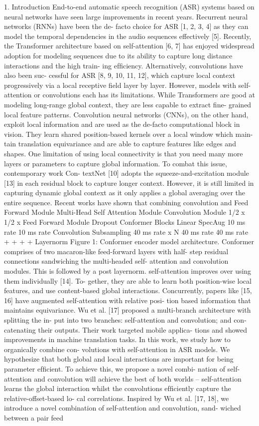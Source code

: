 1. Introduction End-to-end automatic speech recognition (ASR) systems based on neural networks have seen large improvements in recent years. Recurrent neural networks (RNNs) have been the de- facto choice for ASR [1, 2, 3, 4] as they can model the temporal dependencies in the audio sequences effectively [5]. Recently, the Transformer architecture based on self-attention [6, 7] has enjoyed widespread adoption for modeling sequences due to its ability to capture long distance interactions and the high train- ing efﬁciency. Alternatively, convolutions have also been suc- cessful for ASR [8, 9, 10, 11, 12], which capture local context progressively via a local receptive ﬁeld layer by layer. However, models with self-attention or convolutions each has its limitations. While Transformers are good at modeling long-range global context, they are less capable to extract ﬁne- grained local feature patterns. Convolution neural networks (CNNs), on the other hand, exploit local information and are used as the de-facto computational block in vision. They learn shared position-based kernels over a local window which main- tain translation equivariance and are able to capture features like edges and shapes. One limitation of using local connectivity is that you need many more layers or parameters to capture global information. To combat this issue, contemporary work Con- textNet [10] adopts the squeeze-and-excitation module [13] in each residual block to capture longer context. However, it is still limited in capturing dynamic global context as it only applies a global averaging over the entire sequence. Recent works have shown that combining convolution and Feed Forward Module Multi-Head Self Attention Module Convolution Module 1/2 x 1/2 x Feed Forward Module Dropout Conformer Blocks Linear SpecAug 10 ms rate 10 ms rate Convolution Subsampling 40 ms rate x N 40 ms rate 40 ms rate + + + + Layernorm Figure 1: Conformer encoder model architecture. Conformer comprises of two macaron-like feed-forward layers with half- step residual connections sandwiching the multi-headed self- attention and convolution modules. This is followed by a post layernorm. self-attention improves over using them individually [14]. To- gether, they are able to learn both position-wise local features, and use content-based global interactions. Concurrently, papers like [15, 16] have augmented self-attention with relative posi- tion based information that maintains equivariance. Wu et al. [17] proposed a multi-branch architecture with splitting the in- put into two branches: self-attention and convolution; and con- catenating their outputs. Their work targeted mobile applica- tions and showed improvements in machine translation tasks. In this work, we study how to organically combine con- volutions with self-attention in ASR models. We hypothesize that both global and local interactions are important for being parameter efﬁcient. To achieve this, we propose a novel combi- nation of self-attention and convolution will achieve the best of both worlds – self-attention learns the global interaction whilst the convolutions efﬁciently capture the relative-offset-based lo- cal correlations. Inspired by Wu et al. [17, 18], we introduce a novel combination of self-attention and convolution, sand- wiched between a pair feed 
